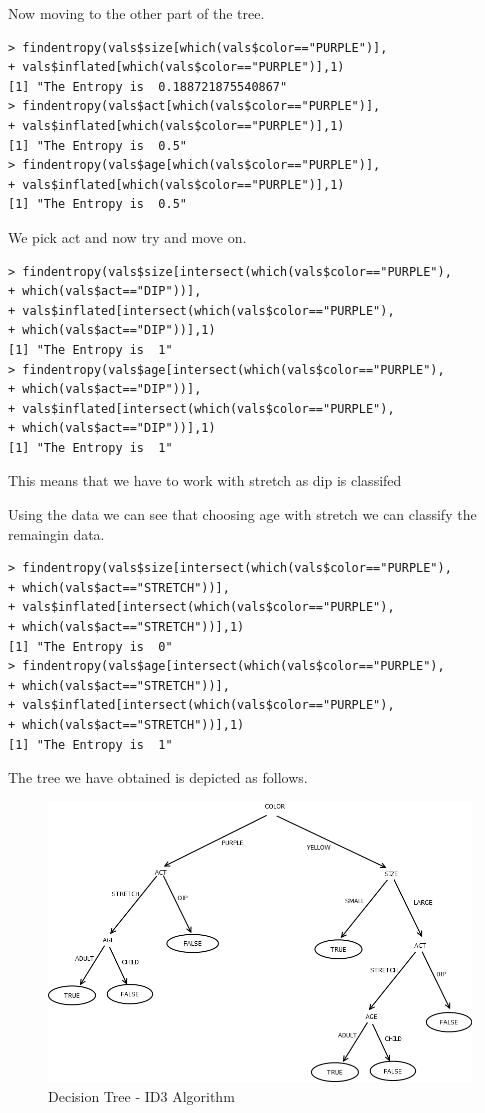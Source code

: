 \documentclass[fontsize=10pt]{scrartcl}
\begin{document}
\begin{enumerate}
Now moving to the other part of the tree.

\begin{verbatim}
> findentropy(vals$size[which(vals$color=="PURPLE")],
+ vals$inflated[which(vals$color=="PURPLE")],1)
[1] "The Entropy is  0.188721875540867"
> findentropy(vals$act[which(vals$color=="PURPLE")],
+ vals$inflated[which(vals$color=="PURPLE")],1)
[1] "The Entropy is  0.5"
> findentropy(vals$age[which(vals$color=="PURPLE")],
+ vals$inflated[which(vals$color=="PURPLE")],1)
[1] "The Entropy is  0.5"
\end{verbatim}
		We pick act and now try and move on.

\begin{verbatim}	
> findentropy(vals$size[intersect(which(vals$color=="PURPLE"),
+ which(vals$act=="DIP"))],
+ vals$inflated[intersect(which(vals$color=="PURPLE"),
+ which(vals$act=="DIP"))],1)
[1] "The Entropy is  1"
> findentropy(vals$age[intersect(which(vals$color=="PURPLE"),
+ which(vals$act=="DIP"))],
+ vals$inflated[intersect(which(vals$color=="PURPLE"),
+ which(vals$act=="DIP"))],1)
[1] "The Entropy is  1"
\end{verbatim}
		This means that we have to work with stretch as dip is classifed

		Using the data we can see that choosing age with stretch we can classify the remaingin data.
\begin{verbatim}
> findentropy(vals$size[intersect(which(vals$color=="PURPLE"),
+ which(vals$act=="STRETCH"))],
+ vals$inflated[intersect(which(vals$color=="PURPLE"),
+ which(vals$act=="STRETCH"))],1)
[1] "The Entropy is  0"
> findentropy(vals$age[intersect(which(vals$color=="PURPLE"),
+ which(vals$act=="STRETCH"))],
+ vals$inflated[intersect(which(vals$color=="PURPLE"),
+ which(vals$act=="STRETCH"))],1)
[1] "The Entropy is  1"
\end{verbatim}
		
		The tree we have obtained is depicted as follows.
		\begin{figure}[H]
			\begin{center}
				\includegraphics[width=\textwidth]{resources/q2_img1.png}
				\caption{Decision Tree - ID3 Algorithm}
			\end{center}
		\end{figure}


\end{enumerate}
\end{document}
